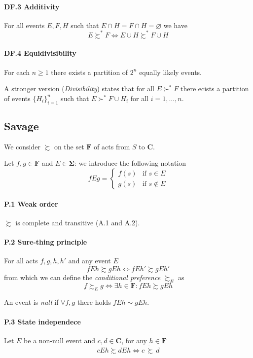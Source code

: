 \documentclass[14pt]{extarticle}
\begin{document}
\paragraph{DF.3 Additivity}
For all events $E, F, H$ such that $E \cap H = F \cap H = \varnothing$ we have
\[
	E \succsim^* F \iff E \cup H \succsim^* F \cup H
\]

\paragraph{DF.4 Equidivisibility}
For each $n \geq 1$ there exists a partition of $2^n$ equally likely events.

A stronger version (\textit{Divisibility}) states that for all $E \succ^* F$ there ecists
a partition of events $\{H_i\}^n_{i = 1}$
such that $E \succ^* F \cup H_i$ for all $i = 1, \dots, n$.

\subsection{Savage}
We consider $\succsim$ on the set $\bm F$ of acts from $S$ to $\bm C$.

Let $f, g \in \bm F$ and $E \in \bm \Sigma$: we introduce the following notation
\[
	fEg = \begin{cases}
		f(s) & \text{if } s \in E    \\
		g(s) & \text{if } s \notin E
	\end{cases}
\]

\paragraph{P.1 Weak order}
$\succsim$ is complete and transitive (A.1 and A.2).

\paragraph{P.2 Sure-thing principle}
For all acts $f, g, h, h'$ and any event $E$
\[
	fEh \succsim gEh \iff fEh' \succsim gEh'
\]
from which we can define the \textit{conditional preference} $\succsim_E$ as
\[
	f \succsim_E g \iff \exists h \in \bm F : f E h \succsim gEh
\]

An event is \textit{null} if $\forall f, g$ there holds $fEh \sim gEh$.

\paragraph{P.3 State independece}
Let $E$ be a non-null event and $c, d \in \bm C$, for any $h \in \bm F$
\[
	cEh \succsim dEh \iff c\, \dot \succsim \, d
\]
\end{document}
